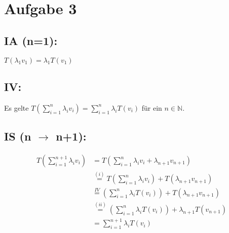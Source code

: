 \documentclass{article}
\begin{document}
\section*{Aufgabe 3}

\subsection*{IA (n=1):} 
$T(\lambda_1 v_1) = \lambda_1 T(v_1)$

\subsection*{IV:} 
Es gelte $T\left(\sum_{i=1}^{n} \lambda_i v_i\right) = \sum_{i=1}^{n} \lambda_i T(v_i)$ für ein $n \in \mathbb{N}$.

\subsection*{IS (n $\to$ n+1):}
\begin{align*} T\left(\sum_{i=1}^{n+1} \lambda_i v_i\right) &= T\left(\sum_{i=1}^{n} \lambda_i v_i + \lambda_{n+1} v_{n+1}\right) \\ &\overset{(i)}{=} T\left(\sum_{i=1}^{n} \lambda_i v_i\right) + T(\lambda_{n+1} v_{n+1})  \\ &\overset{IV}{=} \left(\sum_{i=1}^{n} \lambda_i T(v_i)\right) + T(\lambda_{n+1} v_{n+1}) \\ &\overset{(ii)}{=} \left(\sum_{i=1}^{n} \lambda_i T(v_i)\right) + \lambda_{n+1} T(v_{n+1})  \\ &= \sum_{i=1}^{n+1} \lambda_i T(v_i) \end{align*}
\end{document}
